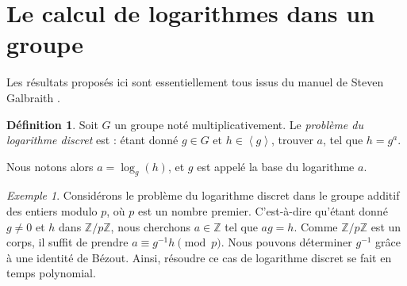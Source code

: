 \documentclass[a4paper, titlepage]{article}
\theoremstyle{definition}
\newtheorem{defi}[theo]{Définition}
\theoremstyle{remark}
\newtheorem{exem}[theo]{Exemple}
\def\Z{\mathbb Z}
\def\gf{\operatorname{GF}}
\def\ppcm{\operatorname{ppcm}}
\def\gen #1{\left\langle#1\right\rangle}
\begin{document}

\section{Le calcul de logarithmes dans un groupe}\label{logDiscret}

Les résultats proposés ici sont essentiellement tous issus du manuel de Steven Galbraith \cite[section 13 et 14, pp. 246 à 297]{galbraith2012}.

\begin{defi}\label{defLogDiscret}
Soit $G$ un groupe noté multiplicativement. Le \textit{problème du logarithme discret} est : étant donné $g\in G$ et $h \in \gen{g}$, trouver $a$, tel que $h=g^a$.\end{defi}
Nous notons alors $a=\log_g(h)$, et $g$ est appelé la base du logarithme $a$.

\begin{exem}
Considérons le problème du logarithme discret dans le groupe additif des entiers modulo $p$, où $p$ est un nombre premier. C'est-à-dire qu'étant donné $g \neq 0$ et $h$ dans $\Z/p\Z$, nous cherchons $a \in \Z$ tel que $ag = h$. Comme $\Z/p\Z$ est un corps, il suffit de prendre $a \equiv g^{-1}h \pmod{p}$. Nous pouvons déterminer $g^{-1}$ grâce à une identité de Bézout. Ainsi, résoudre ce cas de logarithme discret se fait en temps polynomial.
\end{exem}
\end{document}
